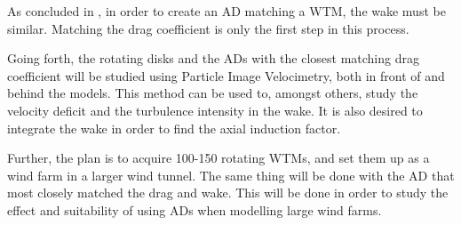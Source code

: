 As concluded in \cite{}, in order to create an AD matching a WTM, the wake must be similar. Matching the drag coefficient is only the first step in this process. 

Going forth, the rotating disks and the ADs with the closest matching drag coefficient will be studied using Particle Image Velocimetry, both in front of and behind the models. This method can be used to, amongst others, study the velocity deficit and the turbulence intensity in the wake. It is also desired to integrate the wake in order to find the axial induction factor. 

Further, the plan is to acquire 100-150 rotating WTMs, and set them up as a wind farm in a larger wind tunnel. The same thing will be done with the AD that most closely matched the drag and wake. This will be done in order to study the effect and suitability of using ADs when modelling large wind farms. 




